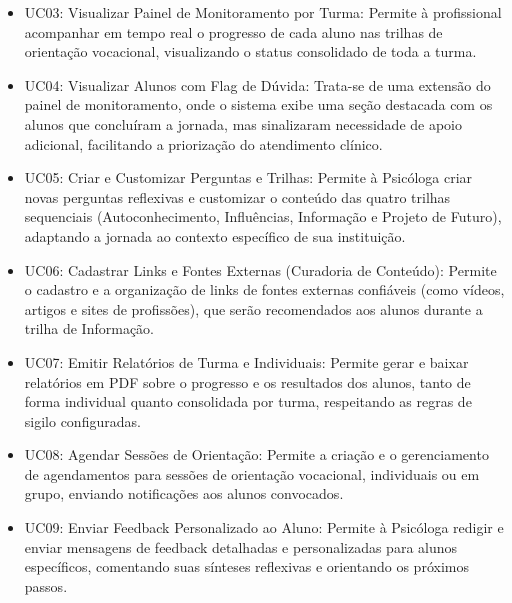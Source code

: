 \vspace{\baselineskip}
\vspace{-0.5\baselineskip}
\begin{itemize}
    \item UC03: Visualizar Painel de Monitoramento por Turma: Permite à profissional acompanhar em tempo real o progresso de cada aluno nas trilhas de orientação vocacional, visualizando o status consolidado de toda a turma.
    \item UC04: Visualizar Alunos com Flag de Dúvida: Trata-se de uma extensão do painel de monitoramento, onde o sistema exibe uma seção destacada com os alunos que concluíram a jornada, mas sinalizaram necessidade de apoio adicional, facilitando a priorização do atendimento clínico.
    \item UC05: Criar e Customizar Perguntas e Trilhas: Permite à Psicóloga criar novas perguntas reflexivas e customizar o conteúdo das quatro trilhas sequenciais (Autoconhecimento, Influências, Informação e Projeto de Futuro), adaptando a jornada ao contexto específico de sua instituição.
    \item UC06: Cadastrar Links e Fontes Externas (Curadoria de Conteúdo): Permite o cadastro e a organização de links de fontes externas confiáveis (como vídeos, artigos e sites de profissões), que serão recomendados aos alunos durante a trilha de Informação.
    \item UC07: Emitir Relatórios de Turma e Individuais: Permite gerar e baixar relatórios em PDF sobre o progresso e os resultados dos alunos, tanto de forma individual quanto consolidada por turma, respeitando as regras de sigilo configuradas.
    \item UC08: Agendar Sessões de Orientação: Permite a criação e o gerenciamento de agendamentos para sessões de orientação vocacional, individuais ou em grupo, enviando notificações aos alunos convocados.
    \item UC09: Enviar Feedback Personalizado ao Aluno: Permite à Psicóloga redigir e enviar mensagens de feedback detalhadas e personalizadas para alunos específicos, comentando suas sínteses reflexivas e orientando os próximos passos.
\end{itemize}


